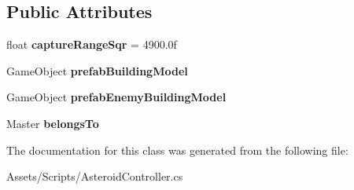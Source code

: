 \subsection*{Public Attributes}
\begin{DoxyCompactItemize}
\item 
\hypertarget{class_asteroid_controller_a1a82623f0a5fbab9d9abf8608c2db739}{}float {\bfseries capture\+Range\+Sqr} = 4900.\+0f\label{class_asteroid_controller_a1a82623f0a5fbab9d9abf8608c2db739}

\item 
\hypertarget{class_asteroid_controller_a450dcd7944d45dc1055950b6ba42dae8}{}Game\+Object {\bfseries prefab\+Building\+Model}\label{class_asteroid_controller_a450dcd7944d45dc1055950b6ba42dae8}

\item 
\hypertarget{class_asteroid_controller_a3d499ebc9c4556776a3b736664f2a1a5}{}Game\+Object {\bfseries prefab\+Enemy\+Building\+Model}\label{class_asteroid_controller_a3d499ebc9c4556776a3b736664f2a1a5}

\item 
\hypertarget{class_asteroid_controller_a5980b7670033334fe07315a63540d192}{}Master {\bfseries belongs\+To}\label{class_asteroid_controller_a5980b7670033334fe07315a63540d192}

\end{DoxyCompactItemize}


The documentation for this class was generated from the following file\+:\begin{DoxyCompactItemize}
\item 
Assets/\+Scripts/Asteroid\+Controller.\+cs\end{DoxyCompactItemize}
